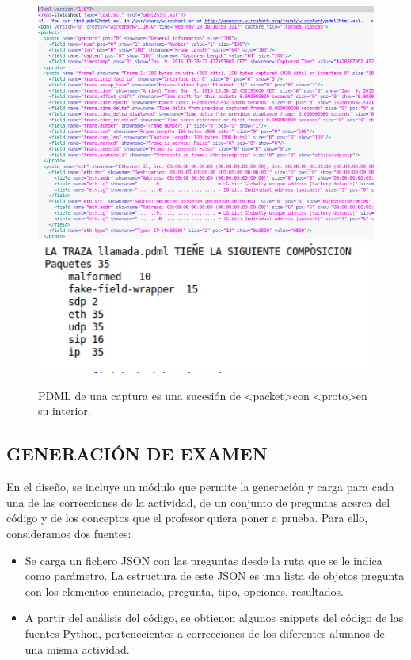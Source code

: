 \begin{figure}[H]
   \centering
   \includegraphics[width=16cm]{img/Selection_015_pdml_1}
   \includegraphics[width=16cm]{img/Selection_029_pdml}
   \caption{PDML de una captura es una sucesión de \textless packet\textgreater \space   con \textless proto\textgreater  \space en su interior.}
   \label{figura:pdml}
\end{figure}


\subsection{GENERACIÓN DE EXAMEN}

En el diseño, se incluye un módulo que permite la generación y carga para cada una de las correcciones de la actividad, de un conjunto de preguntas acerca del código y de los conceptos que el profesor quiera poner a prueba. Para ello, consideramos dos fuentes:\\

\begin{itemize}
\item Se carga un fichero JSON con las preguntas desde la ruta que se le indica como parámetro. La estructura de este JSON es una lista de objetos pregunta con los elementos enunciado, pregunta, tipo, opciones, resultados.\\

\item A partir del análisis del código, se obtienen  algunos snippets del código de las fuentes Python, pertenecientes a correcciones de los diferentes alumnos de una misma actividad.
\end{itemize}


